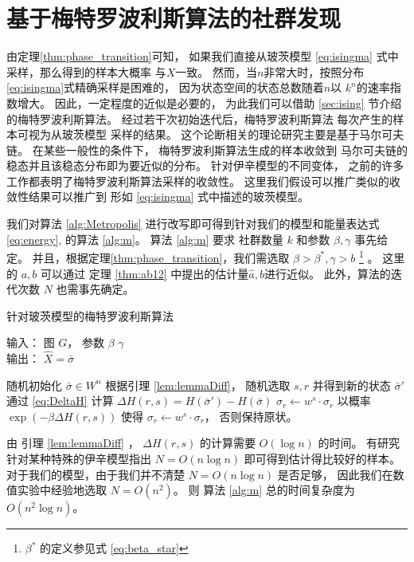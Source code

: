 \section{基于梅特罗波利斯算法的社群发现}\label{sec:ms}

由定理\ref{thm:phase_transition}可知，
如果我们直接从玻茨模型 \eqref{eq:isingma} 式中采样，那么得到的样本大概率
与$X$一致。
然而，当$n$非常大时，按照分布\eqref{eq:isingma}式精确采样是困难的，
因为状态空间的状态总数随着$n$以
$k^n$的速率指数增大。
因此，一定程度的近似是必要的，
为此我们可以借助 \ref{sec:ising} 节介绍的梅特罗波利斯算法。 
经过若干次初始迭代后，梅特罗波利斯算法
每次产生的样本可视为从玻茨模型 采样的结果。
这个论断相关的理论研究主要是基于马尔可夫链。
在某些一般性的条件下，
梅特罗波利斯算法生成的样本收敛到
马尔可夫链的稳态并且该稳态分布即为要近似的分布。
针对伊辛模型的不同变体，
之前的许多工作都表明了梅特罗波利斯算法采样的收敛性\cite{diaconis1998we}。
这里我们假设可以推广类似的收敛性结果可以推广到
形如 \eqref{eq:isingma} 式中描述的玻茨模型。

我们对算法 \ref{alg:Metropolis}
进行改写即可得到针对我们的模型和能量表达式 \eqref{eq:energy},
的算法 \ref{alg:m}。
算法 \ref{alg:m} 要求
社群数量 $k$ 和参数 $\beta, \gamma$ 事先给定。
并且，根据定理\ref{thm:phase_transition}，我们需选取  $\beta>\beta^*, \gamma > b$
\footnote{ $\beta^*$ 的定义参见式 \eqref{eq:beta_star} }
。
这里的 $a, b$
可以通过 定理 \ref{thm:ab12} 中提出的估计量$\hat{a},\hat{b}$进行近似。
此外，算法的迭代次数  $N$
也需事先确定。
\begin{algorithm}[H]
	\caption{针对玻茨模型的梅特罗波利斯算法} \label{alg:m}
	输入： 图 $G$， 参数 $\beta$ $\gamma$ \\
	输出： $\hat{X} = \bar{\sigma}$
	\begin{algorithmic}[1]
		\STATE 随机初始化 $\bar{\sigma} \in W^n$ %
		\STATE 根据引理 \ref{lem:lemmaDiff}，
		随机选取 $s, r$ 并得到新的状态
		 $\bar{\sigma}'$
		\STATE 通过 \eqref{eq:DeltaH} 计算 $\Delta H(r,s) = H(\bar{\sigma}') - H(\bar{\sigma})$ %
		\STATE $\sigma_r \leftarrow w^s \cdot \sigma_r$ %
		\ELSE
		\STATE 以概率 $\exp(-\beta \Delta H(r,s))$ 使得
			$\sigma_r \leftarrow w^s \cdot \sigma_r$，
			否则保持原状。 %
		\ENDIF %
		\ENDFOR
	\end{algorithmic}
\end{algorithm}
 由 引理 \ref{lem:lemmaDiff} ， $\Delta H(r,s)$ 的计算需要 $O(\log n)$ 的时间。
有研究针对某种特殊的伊辛模型指出
$N=O(n\log n)$ 即可得到估计得比较好的样本\cite{mcmc}。
对于我们的模型，由于我们并不清楚 $ N = O(n\log n)$ 是否足够，
因此我们在数值实验中经验地选取 $N=O(n^2)$。
则 算法 \ref{alg:m} 总的时间复杂度为 $O(n^2 \log n)$。



